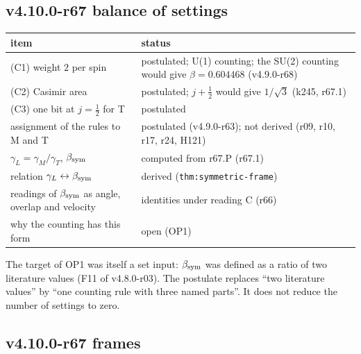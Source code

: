 \subsection*{v4.10.0-r67 balance of settings}
\label{subsec:v4100-r67-balance}

\begin{center}
\small
\begin{tabular}{@{}>{\raggedright\arraybackslash}p{}>{\raggedright\arraybackslash}p{}@{}}
\toprule
item & status\\
\midrule
(C1) weight \(2\) per spin & postulated; U(1) counting; the SU(2) counting would give \(\beta=0.604468\) (v4.9.0-r68)\\
(C2) Casimir area & postulated; \(j+\tfrac12\) would give \(1/\sqrt3\) (k245, r67.1)\\
(C3) one bit at \(j=\tfrac12\) for T & postulated\\
assignment of the rules to M and T & postulated (v4.9.0-r63); not derived (r09, r10, r17, r24, H121)\\
\(\gamma_L=\gamma_M/\gamma_T\), \(\beta_{\rm sym}\) & computed from r67.P (r67.1)\\
relation \(\gamma_L\leftrightarrow\beta_{\rm sym}\) & derived (\texttt{thm:symmetric-frame})\\
readings of \(\beta_{\rm sym}\) as angle, overlap and velocity & identities under reading C (r66)\\
why the counting has this form & open (OP1)\\
\bottomrule
\end{tabular}
\end{center}
The target of OP1 was itself a set input: \(\beta_{\rm sym}\) was defined as a ratio of two literature values (F11 of v4.8.0-r03).  The postulate
replaces ``two literature values'' by ``one counting rule with three named parts''.  It does not reduce the number of settings to zero.

\subsection*{v4.10.0-r67 frames}
\label{subsec:v4100-r67-frames}

